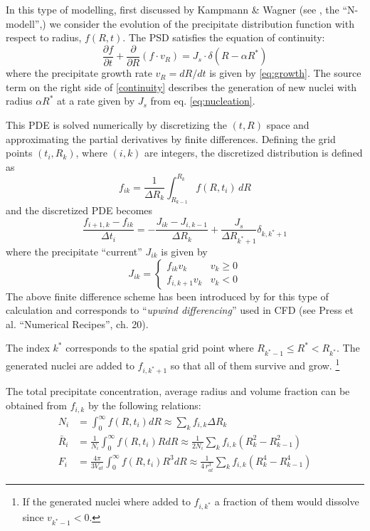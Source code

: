 \documentclass[12pt,a4paper]{article}
\begin{document}
In this type of modelling, first discussed by Kampmann \& Wagner (see \citet{Wagner-2005-HomogeneousSecond-P}, the ``N-modell'',) we consider the evolution of the precipitate distribution function with respect to radius, $f(R,t)$. The PSD satisfies the equation of continuity:
\begin{equation}
\label{continuity}
\frac{\partial f}{\partial t} + \frac{\partial }{\partial R} (f \cdot v_R) = J_s \cdot \delta(R - \alpha R^*)
\end{equation}
where the precipitate growth rate $v_R = dR/dt$ is given by \eqref{eq:growth}. The source term on the right side of \eqref{continuity} describes the generation of new nuclei with radius $\alpha R^*$ at a rate given by $J_s$ from eq. \eqref{eq:nucleation}.

This PDE is solved numerically by discretizing the $(t,R)$ space and approximating the partial derivatives by finite differences. Defining the grid points $(t_i, R_k)$, where $(i,k)$ are integers, the discretized distribution is defined as
\begin{equation}
f_{ik} = \frac{1}{\Delta R_k} \int_{R_{k-1}}^{R_k}f(R,t_i)\,dR
\end{equation}
and the discretized PDE becomes
\begin{equation}
\label{PDE}
\frac{f_{i+1,k} - f_{ik}}{\Delta t_i} = - \frac{J_{ik} - J_{i,k-1}}{\Delta R_k} + \frac{J_s}{\Delta R_{k^*+1}} \delta_{k,k^*+1}
\end{equation}
where the precipitate ``current'' $J_{ik}$ is given by
\begin{equation} 
J_{ik} = 
\begin{cases}
f_{ik}v_k & v_k \geq 0 \\
f_{i,k+1}v_k & v_k<0
\end{cases}
\end{equation}
The above finite difference scheme has been introduced by \citet{Myhr-2000-Modellingofnon-iso} for this type of calculation and corresponds to ``\textit{upwind differencing}'' used in CFD (see Press et al. ``Numerical Recipes'', ch. 20).

The index $k^*$ corresponds to the spatial grid point where $R_{k^*-1} \leq  R^* < R_{k^*}$. The generated nuclei are added to $f_{i,k^*+1}$ so that all of them survive and grow. \footnote{If the generated nuclei where added to $f_{i,k^*}$ a fraction of them would dissolve since $v_{k^*-1}<0.$ }

The total precipitate concentration, average radius and volume fraction can be obtained from $f_{i,k}$ by the following relations:
\begin{subequations}
	\begin{align}
N_i &= \int_0^\infty f(R,t_i) dR 
\approx \sum_k { f_{i,k} \Delta R_k } \\
\bar{R}_i &= \frac{1}{N_i}\int_0^\infty f(R,t_i) R dR
\approx \frac{1}{2 N_i}\sum_k { f_{i,k} (R_k^2-R_{k-1}^2 ) }  \\
F_i &= \frac{4\pi}{3V_{at}} \int_0^\infty f(R,t_i) R^3 dR
\approx \frac{1}{4\, r_{at}^3} \sum_k { f_{i,k} (R_k^4-R_{k-1}^4 )  } 
	\end{align}
\end{subequations}
\end{document}
